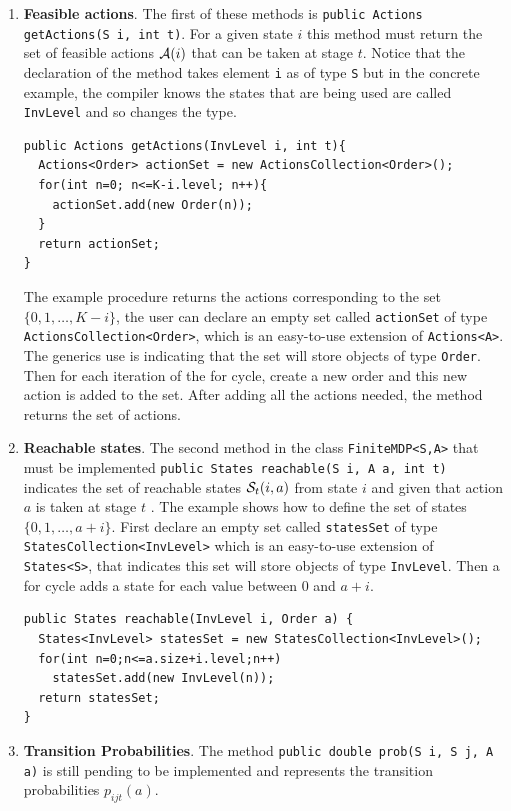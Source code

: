 \documentclass[11pt]{article}
\newcommand {\cA}{\ensuremath \mathcal{A}}
\newcommand {\cS}{\ensuremath \mathcal{S}}
\begin{document}
\begin{enumerate}
\item \textbf{Feasible actions}. The first of these methods is \lstinline!public Actions getActions(S i, int t)!. For a given state $i$ this method must return the set of feasible actions $\cA(i)$ that can be taken at stage $t$. Notice that the declaration of the method takes element \lstinline!i! as of type \lstinline!S! but in the concrete example, the compiler knows the states that are being used are called \lstinline!InvLevel! and so changes the type.

\begin{lstlisting}
public Actions getActions(InvLevel i, int t){
  Actions<Order> actionSet = new ActionsCollection<Order>();
  for(int n=0; n<=K-i.level; n++){
    actionSet.add(new Order(n));
  }
  return actionSet;
}
\end{lstlisting}

The example procedure returns the actions corresponding to the set $\{0,1,\ldots,K-i\}$, the user can declare an empty set called \lstinline!actionSet! of type \lstinline!ActionsCollection<Order>!, which is an easy-to-use extension of \lstinline!Actions<A>!. The generics use is indicating that the set will store objects of type \lstinline!Order!. Then for each iteration of the for cycle, create a new order and this new action is added to the set. After adding all the actions needed, the method returns the set of actions.

\item \textbf{Reachable states}. The second method in the class \lstinline!FiniteMDP<S,A>! that must be implemented \lstinline!public States reachable(S i, A a, int t)! indicates the set of reachable states $\cS_t(i,a)$ from state $i$ and given that action $a$ is taken at stage $t$ . The example shows how to define the set of states $\{0,1,\ldots,a+i\}$. First declare an empty set called \lstinline!statesSet! of type \lstinline!StatesCollection<InvLevel>! which is an easy-to-use extension of \lstinline!States<S>!, that indicates this set will store objects of type \lstinline!InvLevel!. Then a for cycle adds a state for each value between 0 and $a+i$.
\lstset{title=,caption=}
\begin{lstlisting}
public States reachable(InvLevel i, Order a) {
  States<InvLevel> statesSet = new StatesCollection<InvLevel>();
  for(int n=0;n<=a.size+i.level;n++)
    statesSet.add(new InvLevel(n));
  return statesSet;
}
\end{lstlisting}

\item \textbf{Transition Probabilities}. The method \lstinline!public double prob(S i, S j, A a)! is still pending to be implemented and represents the transition probabilities $p_{ijt}(a)$.


\end{enumerate}
\end{document}
